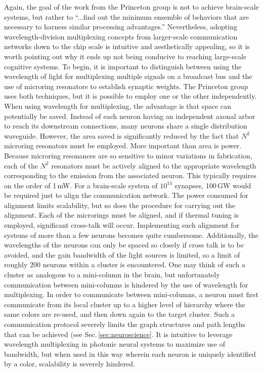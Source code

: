 Again, the goal of the work from the Princeton group is not to achieve brain-scale systems, but rather to ``...find out the minimum ensemble of behaviors that are necessary to harness similar processing advantages.'' \cite{prsh2017} Nevertheless, adopting wavelength-division multiplexing concepts from larger-scale communication networks down to the chip scale is intuitive and aesthetically appealing, so it is worth pointing out why it ends up not being conducive to reaching large-scale cognitive systems. To begin, it is important to distinguish between using the wavelength of light for multiplexing multiple signals on a broadcast bus and the use of microring resonators to establish synaptic weights. The Princeton group uses both techniques, but it is possible to employ one or the other independently. When using wavelength for multiplexing, the advantage is that space can potentially be saved. Instead of each neuron having an independent axonal arbor to reach its downstream connections, many neurons share a single distribution waveguide. However, the area saved is significantly reduced by the fact that $N^2$ microring resonators must be employed. More important than area is power. Because microring resonances are so sensitive to minor variations in fabrication, each of the $N^2$ resonators must be actively aligned to the appropriate wavelength corresponding to the emission from the associated neuron. This typically requires on the order of 1\,mW. For a brain-scale system of $10^{14}$ synapses, 100\,GW would be required just to align the communication network. The power consumed for alignment limits scalability, but so does the procedure for carrying out the alignment. Each of the microrings must be aligned, and if thermal tuning is employed, significant cross-talk will occur. Implementing such alignment for systems of more than a few neurons becomes quite cumbersome. Additionally, the wavelengths of the neurons can only be spaced so closely if cross talk is to be avoided, and the gain bandwidth of the light sources is limited, so a limit of roughly 200 neurons within a cluster is encountered. One may think of such a cluster as analogous to a mini-column in the brain, but unfortunately communication between mini-columns is hindered by the use of wavelength for multiplexing. In order to communicate between mini-columns, a neuron must first communicate from its local cluster up to a higher level of hierarchy where the same colors are re-used, and then down again to the target cluster. Such a communication protocol severely limits the graph structures and path lengths that can be achieved (see Sec.\,\ref{sec:neuroscience}. It is intuitive to leverage wavelength multiplexing in photonic neural systems to maximize use of bandwidth, but when used in this way wherein each neuron is uniquely identified by a color, scalability is severely hindered.

